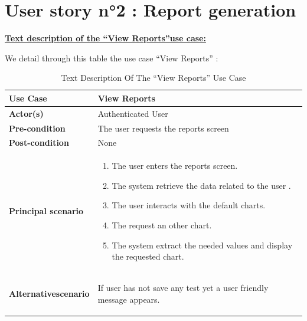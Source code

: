 \newpage
\section{User story n°2 : Report generation}

\textbf{\underline{Text description of the “View Reports”use case:}}

\vspace{0.25cm}

We detail through this table the use case “View Reports” :

\begin{table}[H]
    \renewcommand{\arraystretch}{1.5}
    
   \begin{tabular}{|p{}|p{}|}
   \hline
     
        \textbf{Use Case} & View Reports  \\   \hline
        
        \textbf{Actor(s) } & Authenticated User  \\   \hline
        \textbf{Pre-condition} & The user requests the reports screen \\   \hline
        \textbf{Post-condition} & None  \\   \hline
                \textbf{Principal scenario} & 
                \begin{enumerate}
                    \item The user enters the reports screen.
                    \item The system retrieve the data related to the user .
                    \item The user interacts with the default charts.
                    \item The request an other chart.
                    \item The system extract the needed values and display the requested chart.
                \end{enumerate}  \\   \hline
        
        \textbf{Alternative\newline scenario} & 
        \begin{center}
            
        If user has not save any test yet a user friendly message appears.
        \end{center}
         \\   \hline
\end{tabular}
     \caption{Text Description Of The “View Reports” Use Case}
    \label{tab:my_label}
\end{table}


